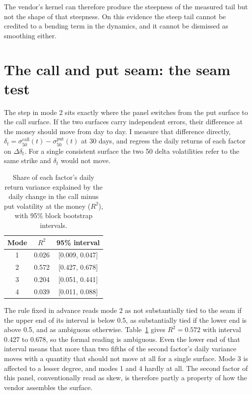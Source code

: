 \documentclass[11pt]{article}
\begin{document}
The vendor's kernel can therefore produce the steepness of the measured tail but not the shape of that steepness. On this evidence the steep tail cannot be credited to a bending term in the dynamics, and it cannot be dismissed as smoothing either.

\section{The call and put seam: the seam test}
\label{sec:seam}

The step in mode 2 sits exactly where the panel switches from the put surface to the call surface. If the two surfaces carry independent errors, their difference at the money should move from day to day. I measure that difference directly, $\delta_t=\sigma^{\mathrm{call}}_{50}(t)-\sigma^{\mathrm{put}}_{50}(t)$ at 30 days, and regress the daily returns of each factor on $\Delta\delta_t$. For a single consistent surface the two 50 delta volatilities refer to the same strike and $\delta_t$ would not move.

\begin{table}[t]
\centering
\caption{Share of each factor's daily return variance explained by the daily change in the call minus put volatility at the money ($R^2$), with 95\% block bootstrap intervals.}
\label{tab:seam}
\begin{tabular}{ccc}
\toprule
Mode & $R^2$ & 95\% interval \\
\midrule
1 & 0.026 & [0.009, 0.047] \\
2 & 0.572 & [0.427, 0.678] \\
3 & 0.204 & [0.051, 0.441] \\
4 & 0.039 & [0.011, 0.088] \\
\bottomrule
\end{tabular}
\end{table}

The rule fixed in advance reads mode 2 as not substantially tied to the seam if the upper end of its interval is below 0.5, as substantially tied if the lower end is above 0.5, and as ambiguous otherwise. Table~\ref{tab:seam} gives $R^2=0.572$ with interval 0.427 to 0.678, so the formal reading is ambiguous. Even the lower end of that interval means that more than two fifths of the second factor's daily variance moves with a quantity that should not move at all for a single surface. Mode 3 is affected to a lesser degree, and modes 1 and 4 hardly at all. The second factor of this panel, conventionally read as skew, is therefore partly a property of how the vendor assembles the surface.
\end{document}
